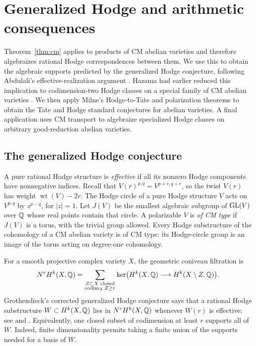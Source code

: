 \section{Generalized Hodge and arithmetic consequences}
\label{cc:section}

Theorem~\ref{thm:cm} applies to products of CM abelian varieties and
therefore algebraizes rational Hodge correspondences between them.
We use this to obtain the algebraic supports predicted by the
generalized Hodge conjecture, following Abdulali's effective-realization
argument
\cite[Lemma~1 and Theorems~3--4]{Abdulali2005CM}. Hazama had earlier
reduced this implication to codimension-two Hodge classes on a special
family of CM abelian varieties
\cite[Theorem~8.3]{Hazama2003CM}. We then apply Milne's Hodge-to-Tate
and polarization theorems to obtain the Tate and Hodge standard
conjectures for abelian varieties.
A final application uses CM transport to algebraize specialized Hodge
classes on arbitrary good-reduction abelian varieties.

\subsection{The generalized Hodge conjecture}

A pure rational Hodge structure is \emph{effective} if all its nonzero
Hodge components have nonnegative indices. Recall that
\(V(r)^{p,q}=V^{p+r,q+r}\), so the twist \(V(r)\) has weight
\(\operatorname{wt}(V)-2r\). The Hodge circle of a pure Hodge structure
\(V\) acts on \(V^{p,q}\) by \(z^{p-q}\), for \(|z|=1\). Let \(J(V)\)
be the smallest algebraic subgroup of \(\operatorname{GL}(V)\) over \(\mathbb{Q}\) whose real
points contain that circle. A polarizable \(V\) is \emph{of CM type}
if \(J(V)\) is a torus, with the trivial group allowed. Every Hodge
substructure of the cohomology of a CM abelian variety is of CM type:
its Hodge-circle group is an image of the torus acting on degree-one
cohomology.

For a smooth projective complex variety \(X\), the geometric coniveau
filtration is
\[
 N^rH^k(X,\mathbb{Q})=
 \sum_{\substack{Z\subset X\text{ closed}\\ \operatorname{codim}_X Z\ge r}}
 \ker\bigl(H^k(X,\mathbb{Q})\longrightarrow H^k(X\setminus Z,\mathbb{Q})\bigr).
\]
Grothendieck's corrected generalized Hodge conjecture says that a
rational Hodge substructure \(W\subset H^k(X,\mathbb{Q})\) lies in
\(N^rH^k(X,\mathbb{Q})\) whenever \(W(r)\) is effective; see
\cite[\S2]{Grothendieck1969General} and \cite[\S2]{Hazama2003CM}.
Equivalently, one closed subset of
codimension at least \(r\) supports all of \(W\). Indeed, finite
dimensionality permits taking a finite union of the supports needed
for a basis of \(W\).

